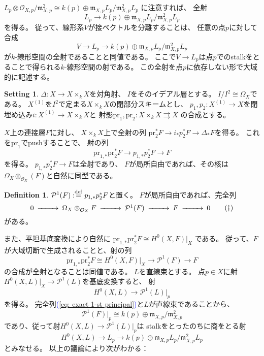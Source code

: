 \documentclass[uplatex]{jsarticle}
\renewcommand{\eqref}[1]{\textcolor{blue}{(\ref{#1})}}
\theoremstyle{definition}
\newtheorem{defi}[defi]{Definition}
\newtheorem*{setting*}{Setting}
\newcommand{\mcO}{\mathcal{O}}
\newcommand{\mcP}{\mathcal{P}}
\DeclareMathOperator{\OOO}{\mcO}
\newcommand{\OX}{\OOO_X}
\newcommand{\dfn}{:\overset{\mathrm{\scriptsize def}}{=}}
\begin{document}
\(L_p\otimes \mathcal{O}_{X,p}/\mathfrak{m}_{X,p}^2
\cong k(p) \oplus \mathfrak{m}_{X,p}L_p/\mathfrak{m}_{X,p}^2L_p\)
に注意すれば、
全射
\[
L_p\to k(p) \oplus \mathfrak{m}_{X,p}L_p/\mathfrak{m}_{X,p}^2L_p
\]
を得る。
従って、線形系\(V\)が接ベクトルを分離することは、
任意の点\(p\)に対して合成
\[
V\to L_p \to k(p) \oplus \mathfrak{m}_{X,p}L_p/\mathfrak{m}_{X,p}^2L_p
\]
が\(k\)-線形空間の全射であることと同値である。
ここで\(V\to L_p\)は点\(p\)でのstalkをとることで得られる\(k\)-線形空間の射である。
この全射を点\(p\)に依存しない形で大域的に記述する。

\begin{setting*}
  \(\Delta:X\to X\times_k X\)を対角射、
  \(I\)をそのイデアル層とする。
  \(I/I^2\cong \Omega_X\)である。
  \(X^{(1)}\)を\(I^2\)で定まる\(X\times_kX\)の閉部分スキームとし、
  \(p_1,p_2:X^{(1)}\to X\)を閉埋め込み\(i:X^{(1)}\to X\times_kX\)と
  射影\(\mathrm{pr}_1,\mathrm{pr}_2: X\times_kX\rightrightarrows X\)
  の合成とする。
\end{setting*}


\(X\)上の連接層\(F\)に対し、
\(X\times_kX\)上で全射の列
\(\mathrm{pr}_2^*F\to i_*p_2^*F\to \Delta_*F\)を得る。
これを\(\mathrm{pr}_1\)でpushすることで、
射の列
\[
\mathrm{pr}_{1,*}\mathrm{pr}_2^*F\to p_{1,*}p_2^*F\to F
\]
を得る。
\(p_{1,*}p_2^*F\to F\)は全射であり、
\(F\)が局所自由であれば、その核は\(\Omega_X\otimes_{\OX}(F)\)と自然に同型である。

\begin{defi}
  \(\mcP^1(F)\dfn p_{1,*}p_2^*F\)と置く。
  \(F\)が局所自由であれば、完全列
  \begin{equation}\label{eq: exact 1-st principal}
    \begin{CD}
      0 @>>> \Omega_X\otimes_{\OX}F @>>> \mcP^1(F) @>>> F @>>> 0
    \end{CD}
    \tag{\(\dagger\)}
  \end{equation}
  がある。
\end{defi}

また、平坦基底変換により自然に
\(\mathrm{pr}_{1,*}\mathrm{pr}_2^*F\cong H^0(X,F)|_X\)
である。
従って、\(F\)が大域切断で生成されることと、射の列
\[
\mathrm{pr}_{1,*}\mathrm{pr}_2^*F\cong H^0(X,F)|_X \to \mcP^1(F)\to F
\]
の合成が全射となることは同値である。
\(L\)を直線束とする。
点\(p\in X\)に射\(H^0(X,L)|_X\to \mcP^1(L)\)を基底変換すると、
射
\[
H^0(X,L)\to \mcP^1(L)|_p
\]
を得る。
完全列\eqref{eq: exact 1-st principal}と\(L\)が直線束であることから、
\[
\mcP^1(F)|_p\cong k(p)\oplus \mathfrak{m}_{X,p}/\mathfrak{m}_{X,p}^2
\]
であり、従って射\(H^0(X,L)\to \mcP^1(L)|_p\)は
stalkをとったのちに商をとる射
\[
H^0(X,L)\to L_p \to k(p) \oplus \mathfrak{m}_{X,p}L_p/\mathfrak{m}_{X,p}^2L_p
\]
とみなせる。
以上の議論により次がわかる：
\end{document}
